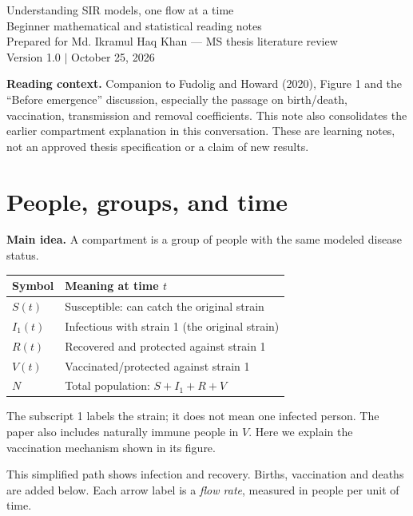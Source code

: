 \documentclass[11pt]{article}
\newcommand{\idea}[1]{\textbf{Main idea.} #1}
\begin{document}
\begin{center}{\LARGE Understanding SIR models, one flow at a time}\\[7pt]
{\large Beginner mathematical and statistical reading notes}\\
Prepared for Md. Ikramul Haq Khan --- MS thesis literature review\\
Version 1.0 $\mid$ October 25, 2026
\end{center}
\textbf{Reading context.} Companion to Fudolig and Howard (2020), Figure 1 and the ``Before emergence'' discussion, especially the passage on birth/death, vaccination, transmission and removal coefficients. This note also consolidates the earlier compartment explanation in this conversation. These are learning notes, not an approved thesis specification or a claim of new results.
\section{People, groups, and time}
\idea{A compartment is a group of people with the same modeled disease status.}
\begin{center}\begin{tabular}{ll}\toprule
Symbol & Meaning at time $t$\\\midrule
$S(t)$ & Susceptible: can catch the original strain\\
$I_1(t)$ & Infectious with strain 1 (the original strain)\\
$R(t)$ & Recovered and protected against strain 1\\
$V(t)$ & Vaccinated/protected against strain 1\\
$N$ & Total population: $S+I_1+R+V$\\\bottomrule
\end{tabular}\end{center}
The subscript 1 labels the strain; it does not mean one infected person. The paper also includes naturally immune people in $V$. Here we explain the vaccination mechanism shown in its figure.
\begin{center}\end{center}
This simplified path shows infection and recovery. Births, vaccination and deaths are added below. Each arrow label is a \emph{flow rate}, measured in people per unit of time.
\end{document}
